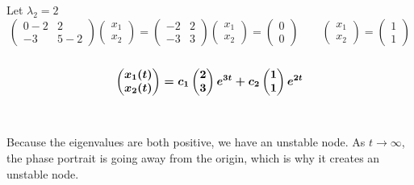 \documentclass[12pt]{article}
\begin{document}
Let $\lambda_2 = 2$
$$\begin{pmatrix}
0 - 2  & 2 \\
-3 & 5 - 2
\end{pmatrix}
\begin{pmatrix}
x_1 \\
x_2
\end{pmatrix} = 
\begin{pmatrix}
-2 & 2 \\
-3 & 3
\end{pmatrix}
\begin{pmatrix}
x_1 \\
x_2
\end{pmatrix} = 
\begin{pmatrix}
0 \\
0
\end{pmatrix} \qquad 
\begin{pmatrix}
x_1 \\
x_2
\end{pmatrix} = 
\begin{pmatrix}
1 \\
1
\end{pmatrix}$$
\\
$$
\boldmath
\begin{pmatrix}
x_1(t) \\
x_2(t)
\end{pmatrix} = 
c_1
\begin{pmatrix}
	2 \\
	3
\end{pmatrix}
e^{3t} + 
c_2
\begin{pmatrix}
	1 \\
	1
\end{pmatrix}
e^{2t}
$$
\\ \\
Because the eigenvalues are both positive, we have an unstable node.  As $t \rightarrow \infty$, the phase portrait is going away from the origin, which is why it creates an unstable node. 
\newpage
\end{document}
